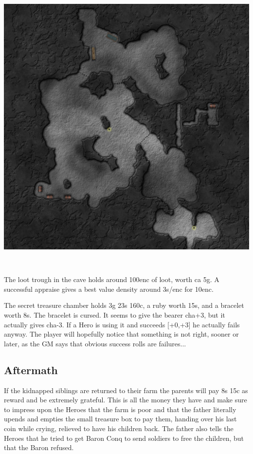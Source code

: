 \begin{center}
\includegraphics[width=1.0\linewidth]{./maps/Eisenkrafs-Bandits-Cave-(32+0+0).jpg}
\end{center}

\


The loot trough in the cave holds around 100enc of loot, worth ca 5g. A successful appraise gives a best value density around 3s/enc for 10enc.

The secret treasure chamber holds 3g 23s 160c, a ruby worth 15s, and a bracelet worth 8s. The bracelet is cursed. It seems to give the bearer cha+3, but it actually gives cha-3. If a Hero is using it and succeeds [+0,+3] he actually fails anyway. The player will hopefully notice that something is not right, sooner or later, as the GM says that obvious success rolls are failures...



\subsection*{Aftermath}
If the kidnapped siblings are returned to their farm the parents will pay 8s 15c as reward and be extremely grateful. This is all the money they have and make sure to impress upon the Heroes that the farm is poor and that the father literally upends and empties the small treasure box to pay them, handing over his last coin while crying, relieved to have his children back.
The father also tells the Heroes that he tried to get Baron Conq to send soldiers to free the children, but that the Baron refused.

